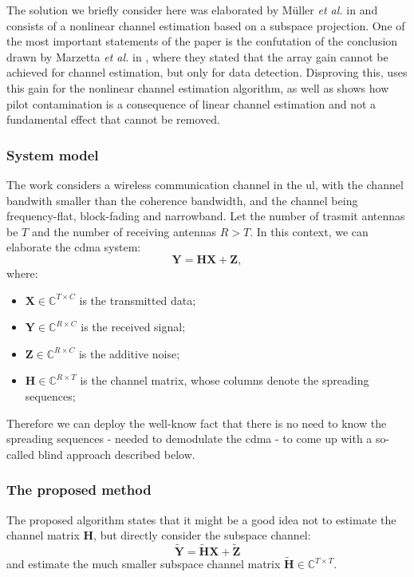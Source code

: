 \documentclass[11pt]{book}
\begin{document}
The solution we briefly consider here was elaborated by M\"uller \textit{et al.} in \cite{Ralf} and consists of a nonlinear channel estimation based on a subspace projection. One of the most important statements of the paper is the confutation of the conclusion drawn by Marzetta \textit{et al.} in \cite{Marzetta2010}, where they stated that the array gain cannot be achieved for channel estimation, but only for data detection. Disproving this, \cite{Ralf} uses this gain for the nonlinear channel estimation algorithm, as well as shows how pilot contamination is a consequence of linear channel estimation and not a fundamental effect that cannot be removed.

\subsubsection{System model}
The work considers a wireless communication channel in the \gls{ul}, with the channel bandwith smaller than the coherence bandwidth, and the channel being frequency-flat, block-fading and narrowband. Let the number of trasmit antennas be $T$ and the number of receiving antennas $R > T$. In this context, we can elaborate the \gls{cdma} system:
\begin{equation}
  \mathbf{Y} = \mathbf{HX} + \mathbf{Z},
\end{equation}
where:
\begin{itemize}
  \item $\mathbf{X} \in \mathbb{C}^{T\times C}$ is the transmitted data;
  \item $\mathbf{Y} \in \mathbb{C}^{R\times C}$ is the received signal;
  \item $\mathbf{Z} \in \mathbb{C}^{R\times C}$ is the additive noise;
  \item $\mathbf{H} \in \mathbb{C}^{R\times T}$ is the channel matrix, whose columns denote the spreading sequences;
\end{itemize}
Therefore we can deploy the well-know fact that there is no need to know the spreading sequences - needed to demodulate the \gls{cdma} - to come up with a so-called blind approach described below.
\subsubsection{The proposed method}
The proposed algorithm states that it might be a good idea not to estimate the channel matrix $\mathbf{H}$, but directly consider the subspace channel:
\begin{equation}
  \mathbf{\tilde{Y}} = \mathbf{\tilde{H}X} + \mathbf{\tilde{Z}}
\end{equation}
and estimate the much smaller subspace channel matrix $\mathbf{\tilde{H}} \in \mathbb{C}^{T\times T}$.
\end{document}
